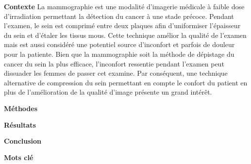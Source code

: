 \noindent
\textbf{Contexte} La mammographie est une modalité d’imagerie médicale à faible dose d'irradiation permettant la détection du cancer à une stade précoce. Pendant l'examen, le sein est comprimé entre deux plaques afin d'uniformiser l'épaisseur du sein et d'étaler les tissus mous.  Cette technique amélior la qualité de l'examen mais est aussi considéré une potentiel source d'inconfort et parfois de douleur pour la patiente. Bien que la mammographie soit la méthode de dépistage du cancer du sein la plus efficace, l’inconfort ressentie pendant l'examen peut dissuader les femmes de passer cet examine. Par conséquent, une technique alternative de compression du sein permettant en compte le confort du patient en plus de l’amélioration de la qualité d'image présente un grand intérêt.

\noindent
\textbf{Méthodes}

\noindent
\textbf{Résultats}

\noindent
\textbf{Conclusion}

\noindent
\textbf{Mots clé}
